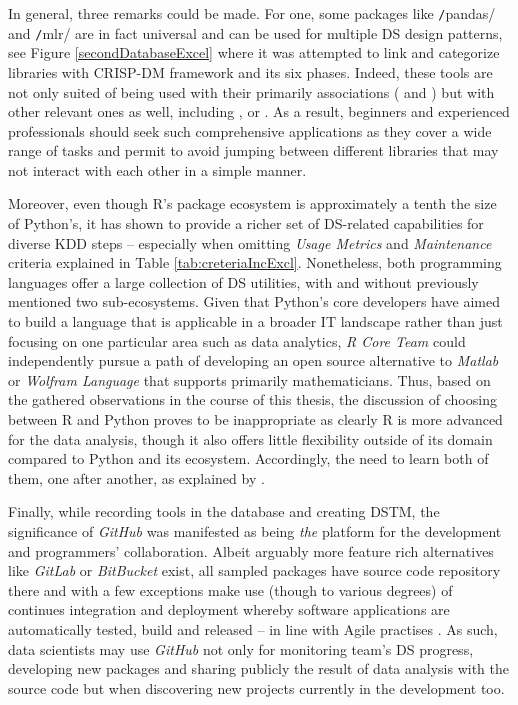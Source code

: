 In general, three remarks could be made.
For one, some packages like \texttt/pandas/ and \texttt/mlr/ are in fact universal and can be used for multiple \ac{DS} design patterns, see Figure \ref{secondDatabaseExcel} where it was attempted to link and categorize libraries with \ac{CRISP-DM} framework and its six phases.
Indeed, these tools are not only suited of being used with their primarily associations ( and ) but with other relevant ones as well, including ,  or .
As a result, beginners and experienced professionals should seek such comprehensive applications as they cover a wide range of tasks and permit to avoid jumping between different libraries that may not interact with each other in a simple manner.

Moreover, even though R's package ecosystem is approximately a tenth the size of Python's, it has shown to provide a richer set of \ac{DS}-related capabilities for diverse \ac{KDD} steps -- especially when omitting \emph{Usage Metrics} and \emph{Maintenance} criteria explained in Table \ref{tab:creteriaIncExcl}.
Nonetheless, both programming languages offer a large collection of \ac{DS} utilities, with and without previously mentioned two sub-ecosystems.
Given that Python's core developers have aimed to build a language that is applicable in a broader \ac{IT} landscape rather than just focusing on one particular area such as data analytics, \emph{R Core Team} could independently pursue a path of developing an open source alternative to \emph{Matlab} or \emph{Wolfram Language} that supports primarily mathematicians.
Thus, based on the gathered observations in the course of this thesis, the discussion of choosing between R and Python proves to be inappropriate as clearly R is more advanced for the data analysis, though it also offers little flexibility outside of its domain compared to Python and its ecosystem. 
Accordingly, the need to learn both of them, one after another, as explained by \textcites{MartijnTheuwissen2015R}{Theuwissen2016}. 

Finally, while recording tools in the database and creating \ac{DSTM}, the significance of \emph{GitHub} was manifested as being \emph{the} platform for the development and programmers' collaboration. 
Albeit arguably more feature rich alternatives like \emph{GitLab} or \emph{BitBucket} exist, all sampled packages have source code repository there and with a few exceptions make use (though to various degrees) of continues integration and deployment whereby software applications are automatically tested, build and released -- in line with Agile practises \parencites{BinasGitLab2013}{PaulGitlab2016}{AgileCI2009}.
As such, data scientists may use \emph{GitHub} not only for monitoring team's \ac{DS} progress, developing new packages and sharing publicly the result of data analysis with the source code but when discovering new projects currently in the development too.

